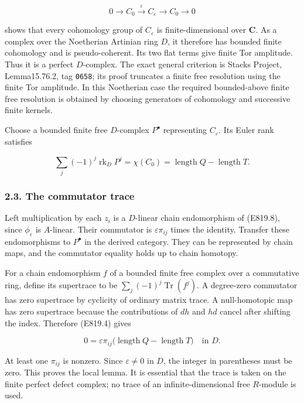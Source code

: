 \[
 0\longrightarrow C_0\xrightarrow{\varepsilon} C_\varepsilon
      \longrightarrow C_0\longrightarrow0
\]

shows that every cohomology group of \(C_\varepsilon\) is
finite-dimensional over \(\mathbf C\). As a complex over the Noetherian
Artinian ring \(D\), it therefore has bounded finite cohomology and is
pseudo-coherent. Its two flat terms give finite Tor amplitude. Thus it
is a perfect \(D\)-complex. The exact general criterion is Stacks
Project, Lemma15.76.2, tag \texttt{0658}; its proof truncates a finite
free resolution using the finite Tor amplitude. In this Noetherian case
the required bounded-above finite free resolution is obtained by
choosing generators of cohomology and successive finite kernels.

Choose a bounded finite free \(D\)-complex \(P^\bullet\) representing
\(C_\varepsilon\). Its Euler rank satisfies

\[
 \sum_j(-1)^j\operatorname{rk}_D P^j
  =\chi(C_0)=\operatorname{length}Q-\operatorname{length}T.
 \tag{E819.9}
\]

\subsubsection{2.3. The commutator trace}\label{SF-E819-the-commutator-trace}

Left multiplication by each \(z_i\) is a \(D\)-linear chain endomorphism
of (E819.8), since \(\phi_\varepsilon\) is \(A\)-linear. Their
commutator is \(\varepsilon\pi_{ij}\) times the identity. Transfer these
endomorphisms to \(P^\bullet\) in the derived category. They can be
represented by chain maps, and the commutator equality holds up to chain
homotopy.

For a chain endomorphism \(f\) of a bounded finite free complex over a
commutative ring, define its supertrace to be
\(\sum_j(-1)^j\operatorname{Tr}(f^j)\). A degree-zero commutator has
zero supertrace by cyclicity of ordinary matrix trace. A null-homotopic
map has zero supertrace because the contributions of \(dh\) and \(hd\)
cancel after shifting the index. Therefore (E819.4) gives

\[
 0=\varepsilon\pi_{ij}
       \bigl(\operatorname{length}Q-\operatorname{length}T\bigr)
       \quad\text{in }D.
 \tag{E819.10}
\]

At least one \(\pi_{ij}\) is nonzero. Since \(\varepsilon\ne0\) in
\(D\), the integer in parentheses must be zero. This proves the local
lemma. It is essential that the trace is taken on the finite perfect
defect complex; no trace of an infinite-dimensional free \(R\)-module is
used.

